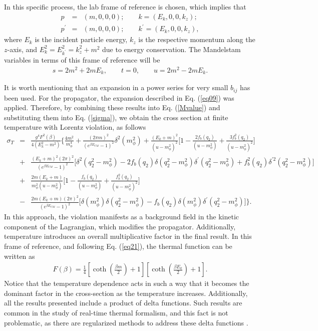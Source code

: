\documentclass[11pt,showpacs,preprintnumbers,amsmath,amssymb,prd,nofootinbib,superscriptaddress]{revtex4-2}
\begin{document}
In this specific process, the lab frame of reference is chosen, which implies that
\begin{eqnarray}
    p&=&(m,0,0,0);\quad\quad
    k=(E_k,0,0,k_z);\nonumber\\
    p^\prime&=&(m,0,0,0);\quad\quad
    k^\prime=(E_k,0,0,k_z),\label{eq21}
\end{eqnarray}
where $E_k$ is the incident particle energy, $k_z$ is the respective momentum along the $z$-axis, and $E_k^2 = E_{k^\prime}^2 = k_z^2 + m^2$ due to energy conservation. The Mandelstam variables in terms of this frame of reference will be
\begin{eqnarray}
s=2m^2+2mE_k,\quad\quad t=0,\quad\quad u=2m^2-2mE_k.
\end{eqnarray}

It is worth mentioning that an expansion in a power series for very small $b_{ij}$ has been used. For the propagator, the expansion described in Eq. (\ref{eq09}) was applied. Therefore, by combining these results into Eq. (\ref{Mvalue}) and substituting them into Eq. (\ref{sigma}), we obtain the cross section at finite temperature with Lorentz violation, as follows
\begin{eqnarray}
     \sigma_T&=&\frac{g^4F^2(\beta)}{4(E_k^2-m^2)}\biggl\{\frac{4m^2}{m_{\phi}^4}+\frac{(2\pi m)^2}{(e^{\beta E_{CM}}-1)^2}\delta^2(m_\phi^2)+\frac{(E_k+m)^2}{(u-m_\phi^2)^2}\bigg[1-\frac{2f_b(q_2)}{(u-m_\phi^2)}+\frac{3f_b^2(q_2)}{(u-m_\phi^2)^2}\bigg]\nonumber\\&+&\frac{(E_k+m)^2(2\pi)^2}{(e^{\beta E_{CM}}-1)^2}\biggl[\delta^2(q_2^2-m_\phi^2)-2f_b(q_2)\delta(q_2^2-m_\phi^2)\delta^\prime(q_2^2-m_\phi^2)+f_b^2(q_2)\delta^{\prime2}(q_2^2-m_\phi^2)\biggr]\nonumber\\
     &+&\frac{2m(E_k+m)}{m_\phi^2(u-m_\phi^2)}\biggl[1-\frac{f_b(q_2)}{(u-m_{\phi}^2)}+\frac{f_b^2(q_2)}{(u-m_{\phi}^2)^2}\biggl]\nonumber\\&-&\frac{2m(E_k+m)(2\pi)^2}{(e^{\beta E_{CM}}-1)^2}\biggl[\delta(m_\phi^2)\delta(q_2^2-m_\phi^2)-f_b(q_2)\delta(m_\phi^2)\delta^\prime(q_2^2-m_\phi^2)\biggr]\biggr\}.\label{eq22}
\end{eqnarray}
In this approach, the violation manifests as a background field in the kinetic component of the Lagrangian, which modifies the propagator. Additionally, temperature introduces an overall multiplicative factor in the final result. In this frame of reference, and following Eq. (\ref{eq21}), the thermal function can be written as
\begin{eqnarray}
    F(\beta)=\frac{1}{4}\left[\coth{\left(\frac{\beta m}{2}\right)}+1\right]\left[\coth{\left(\frac{\beta E_k}{2}\right)}+1\right].
\end{eqnarray}
Notice that the temperature dependence acts in such a way that it becomes the dominant factor in the cross-section as the temperature increases. Additionally, all the results presented include a product of delta functions. Such results are common in the study of real-time thermal formalism, and this fact is not problematic, as there are regularized methods to address these delta functions \cite{regdelta}.
\end{document}
